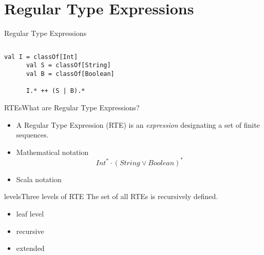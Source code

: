 \section{Regular Type Expressions}

\begin{frame}{Regular Type Expressions}
\end{frame}


\newsavebox\exnoteabbbox
\begin{lrbox}{\exnoteabbbox}
  \begin{minipage}{7cm}
    \begin{lstlisting}[style=scalaioScala]
    \end{lstlisting}
  \end{minipage}
\end{lrbox}

\newsavebox\exnotebox
\begin{lrbox}{\exnotebox}
  \begin{minipage}{7cm}
    \begin{lstlisting}[style=scalaioScala]
      val I = classOf[Int]
      val S = classOf[String]
      val B = classOf[Boolean]

      I.* ++ (S | B).*
    \end{lstlisting}
  \end{minipage}
\end{lrbox}


\begin{frame}{RTEs}{What are Regular Type Expressions?}
  \begin{itemize}
  \item A Regular Type Expression (RTE) is an \emph{expression} designating a set  of finite sequences.
  \item Mathematical notation
    \[Int^* \cdot (String \vee Boolean)^*\]
  \item Scala notation\\
    \usebox\exnotebox
  \end{itemize}
\end{frame}

\begin{frame}{levels}{Three levels of RTE}
  The set of all RTEs is recursively defined.
  \begin{itemize}
  \item leaf level
  \item recursive
  \item extended
  \end{itemize}
\end{frame}

